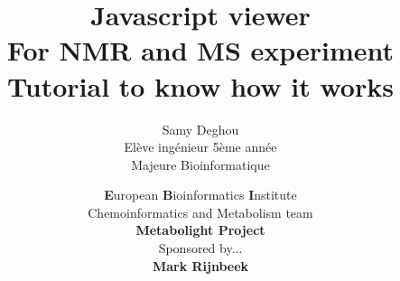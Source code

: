 \documentclass[12pt,a4paper,utf8x]{article}
\title
{
	\normalsize{Javascript viewer\\
	For NMR and MS experiment\\
	}
	\vspace{15mm}
	\textbf{\Huge{Tutorial to know how it works}}
}
\author{Samy Deghou\\
  Elève ingénieur 5ème année\\
  Majeure Bioinformatique\\
	\vspace{45mm}
}
\date{	
	\normalsize{\textbf{E}uropean \textbf{B}ioinformatics \textbf{I}nstitute\\
          Chemoinformatics and  Metabolism team\\
          \textbf{Metabolight Project}\\
          Sponsored by...\\ \textbf{Mark Rijnbeek}
	\vspace{5mm}
	}
}
\begin{document}
\maketitle
\clearpage


\tableofcontents
\clearpage

\begin{onehalfspace}

















%

\end{onehalfspace}

\nocite{*}




\printindex

\appendix
\end{document}
